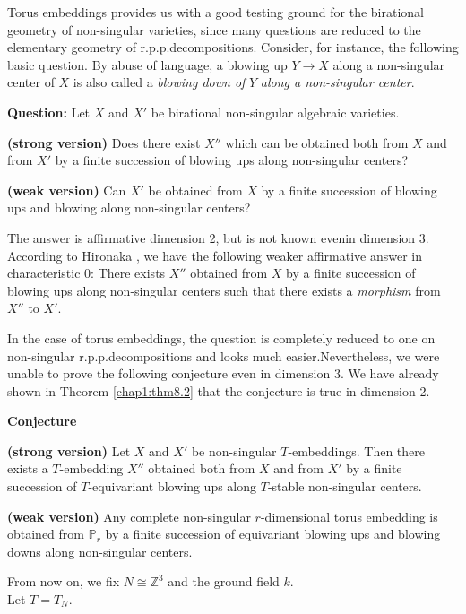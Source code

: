 Torus embeddings provides us  with a good testing ground for the
birational geometry of non-singular varieties, since many questions
are reduced to the  elementary geometry of
r.p.p.decompositions. Consider, for instance, the following basic
question. By abuse of language, a blowing up $Y \rightarrow X$ along a
non-singular center of $X$ is also called a \textit{blowing down of}
$Y$ \textit{along a non-singular center}.  

\medskip
\noindent
{\bf Question:} Let $X$ and $X'$ be birational non-singular algebraic
varieties. 

\medskip
\noindent
\textbf{(strong version)} Does there exist $X''$ which can be obtained
both from $X$ and from $X'$ by a finite succession of blowing ups
along non-singular centers? 

\medskip
\noindent
\textbf{(weak version)} Can $X'$ be obtained from $X$ by a finite
succession of blowing ups and blowing  along non-singular centers? 

The answer is affirmative dimension 2, but is not known
even\pageoriginale in dimension 3. According to Hironaka \cite{keyH3}, we
have the  following weaker affirmative answer in characteristic 0:
There exists $X''$ obtained from $X$ by a finite succession of blowing
ups along non-singular centers such that there exists  a
\textit{morphism} from $X''$ to $X'$.  
 
In the case  of torus embeddings, the question is completely reduced
to one on non-singular r.p.p.decompositions  and looks much
easier.\break Nevertheless, we were  unable to prove the following
conjecture even in dimension 3. We have already shown  in Theorem
\ref{chap1:thm8.2} that the conjecture is true in dimension 2. 

\medskip
\noindent
\textbf{Conjecture}

\medskip
\noindent
\textbf{(strong version)} Let $X$ and $X'$ be non-singular
$T$-embeddings. Then there exists a $T$-embedding $X''$ obtained both
from $X$ and  from $X'$ by a finite succession of $T$-equivariant
blowing ups along $T$-stable non-singular centers. 

\medskip
\noindent
\textbf{(weak version)} Any complete non-singular $r$-dimensional
torus embedding is  obtained from $\mathbb{P}_r$ by a finite
succession of equivariant blowing ups and blowing downs along
non-singular centers. 

From now on, we fix $N \cong \mathbb{Z}^3$ and the ground field
$k$. \\
Let  $T = T_N$. 

